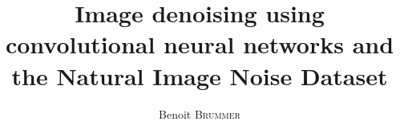 \documentclass{EPL-master-thesis-covers-EN}
\title{Image denoising using convolutional neural networks and the Natural Image Noise Dataset}
\author{Benoit \textsc{Brummer}}
\begin{document}
  \maketitle

  \backcoverpage
\end{document}
